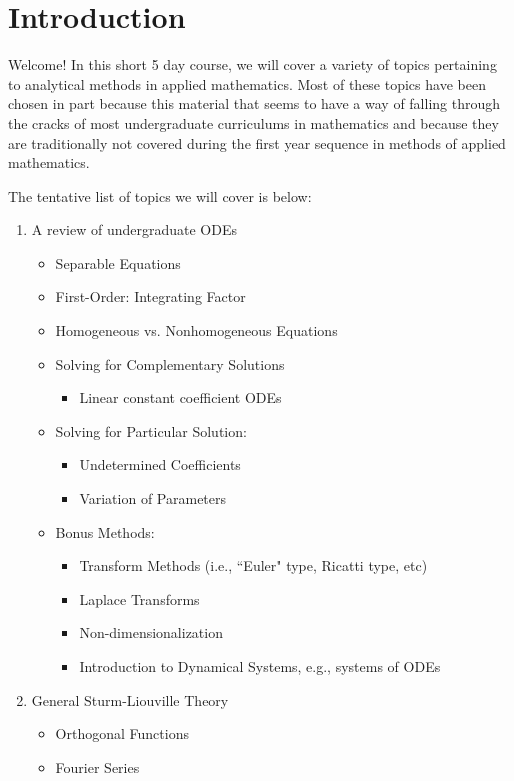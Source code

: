 \graphicspath{{./Intro/}}

\section{Introduction}

Welcome! In this short 5 day course, we will cover a variety of topics pertaining to analytical methods in applied mathematics. Most of these topics have been chosen in part because this material that seems to have a way of falling through the cracks of most undergraduate curriculums in mathematics and because they are traditionally not covered during the first year sequence in methods of applied mathematics. 

The tentative list of topics we will cover is below: 
\begin{enumerate}
%
\item A review of undergraduate ODEs
\begin{itemize}
\item Separable Equations
\item First-Order: Integrating Factor
\item Homogeneous vs. Nonhomogeneous Equations
\item Solving for Complementary Solutions
\begin{itemize}
\item Linear constant coefficient ODEs
\end{itemize}
\item Solving for Particular Solution:
\begin{itemize}
\item Undetermined Coefficients
\item Variation of Parameters
\end{itemize}
\item Bonus Methods:
\begin{itemize}
\item Transform Methods (i.e., ``Euler" type, Ricatti type, etc)
\item Laplace Transforms
\item Non-dimensionalization
\item Introduction to Dynamical Systems, e.g., systems of ODEs
\end{itemize}
\end{itemize} 
%
\item General Sturm-Liouville Theory
\begin{itemize}
\item Orthogonal Functions
\item Fourier Series

\end{itemize}
\end{enumerate}
